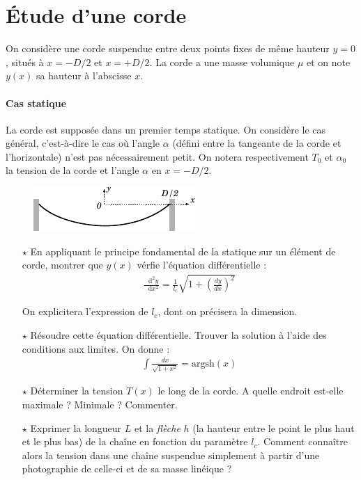 \documentclass{report}
\newcommand*\dif{\mathop{}\!\mathrm{d}}
\begin{document}
\section*{Étude d'une corde}

On considère une corde suspendue entre deux points fixes de même hauteur $y=0$, situés à $x=-D/2$ et $x=+D/2$. La corde a une masse volumique $\mu$ et on note $y(x)$ sa hauteur à l'abscisse $x$.

\paragraph{Cas statique} La corde est supposée dans un premier temps statique. On considère le cas général, c'est-à-dire le cas où l'angle $\alpha$ (défini entre la tangeante de la corde et l'horizontale) n'est pas nécessairement petit. On notera respectivement $T_0$ et $\alpha_0$ la tension de la corde et l'angle $\alpha$ en $x=-D/2$.

\begin{figure}[h!]
\centering
		\includegraphics[scale=1.5]{onde1.pdf}
\end{figure}

\begin{itemize}

	\item[$\star$] En appliquant le principe fondamental de la statique sur un élément de corde, montrer que $y(x)$ vérfie l'équation différentielle :
	\begin{align*}
		\frac{\dif^2 y}{\dif x^2} =\frac{1}{l_c}\sqrt{1+\left( \frac{dy}{dx}\right)^2}
	\end{align*}	
	
	On explicitera l'expression de $l_c$, dont on précisera la dimension.
	
	\item[$\star$] Résoudre cette équation différentielle. Trouver la solution à l'aide des conditions aux limites. On donne : 
	\begin{align*}
		\int \frac{dx}{\sqrt{1+x^2}}=\mathrm{argsh}(x)
	\end{align*}
	
	\item[$\star$] Déterminer la tension $T(x)$ le long de la corde. A quelle endroit est-elle maximale ? Minimale ? Commenter. 
	
	\item[$\star$] Exprimer la longueur $L$ et la \textit{flèche} $h$ (la hauteur entre le point le plus haut et le plus bas) de la chaîne en fonction du paramètre $l_c$. Comment connaître alors la tension dans une chaîne suspendue simplement à partir d'une photographie de celle-ci et de sa masse linéique ?
	
\end{itemize}
\end{document}
